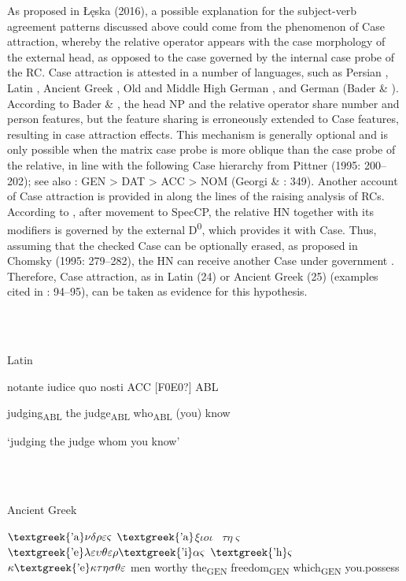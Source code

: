 \documentclass[output=paper]{langsci/langscibook}
\begin{document}
As proposed in Łęska (2016), a possible explanation for the subject-verb agreement patterns discussed above could come from the phenomenon of Case attraction, whereby the relative operator appears with the case morphology of the external head, as opposed to the case governed by the internal case probe of the RC. Case attraction is attested in a number of languages, such as Persian \citep{Aghei2006}, Latin \citep{Bianchi1999}, Ancient Greek \citep{Bianchi1999}, Old and Middle High German \citep{Pittner1995}, and German (Bader \& \citealt{Bayer2006}). According to Bader \& \citet{Bayer2006}, the head NP and the relative operator share number and person features, but the feature sharing is erroneously extended to Case features, resulting in case attraction effects. This mechanism is generally optional and is only possible when the matrix case probe is more oblique than the case probe of the relative, in line with the following Case hierarchy from Pittner (1995: 200–202); see also \citet[122]{Grosu1994}: GEN > DAT > ACC > NOM (Georgi \& \citealt{Salzmann2014}: 349). Another account of Case attraction is provided in \citet{Bianchi1999} along the lines of the raising analysis of RCs. According to \citet{Bianchi1999}, after movement to SpecCP, the relative HN together with its modifiers is governed by the external D\textsuperscript{0}, which provides it with Case. Thus, assuming that the checked Case can be optionally erased, as proposed in Chomsky (1995: 279–282), the HN can receive another Case under government \citep[95]{Bianchi1999}. Therefore, Case attraction, as in Latin (24) or Ancient Greek (25) (examples cited in \citealt{Bianchi1999}: 94–95), can be taken as evidence for this hypothesis. 

\ea%
    \label{ex:key:24}
    \gll\\
        \\
    \glt
    \z

          Latin

  notante   iudice   quo     nosti        ACC [F0E0?] ABL

  judging\textsubscript{ABL}   the judge\textsubscript{ABL}   who\textsubscript{ABL}   (you) know       

  ‘judging the judge whom you know’  

\ea%
    \label{ex:key:25}
    \gll\\
        \\
    \glt
    \z

          Ancient Greek

  $\text{\textgreek{'a}}\nu \delta \rho \varepsilon \varsigma $   $\text{\textgreek{'a}}$$\xi \iota o\iota $~   $\tau \eta \varsigma $   $\text{\textgreek{'e}}\lambda \varepsilon \upsilon \theta \varepsilon \rho \text{\textgreek{'i}}\alpha \varsigma $   $\text{\textgreek{'h}}\varsigma $   $\kappa \text{\textgreek{'e}}\kappa \tau \eta \sigma \theta \varepsilon $        men   worthy   the\textsubscript{GEN}   freedom\textsubscript{GEN}   which\textsubscript{GEN} you.possess  
\end{document}
